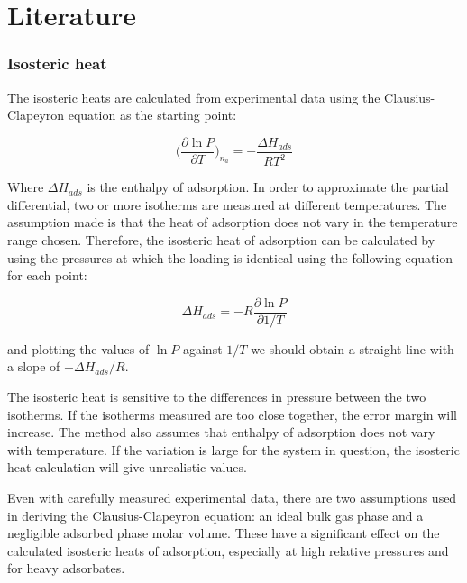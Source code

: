 
\section{Literature}


\subsubsection{Isosteric heat}

The isosteric heats are calculated from experimental data using the Clausius-Clapeyron
equation as the starting point:

\begin{equation}
    \Big( \frac{\partial \ln P}{\partial T} \Big)_{n_a} = -\frac{\Delta H_{ads}}{R T^2}
\end{equation}

Where \(\Delta H_{ads}\) is the enthalpy of adsorption. In order to approximate the
partial differential, two or more isotherms are measured at different temperatures. The
assumption made is that the heat of adsorption does not vary in the temperature range
chosen. Therefore, the isosteric heat of adsorption can be calculated by using the pressures
at which the loading is identical using the following equation for each point:

\begin{equation}
    \Delta H_{ads} = - R \frac{\partial \ln P}{\partial 1 / T}
\end{equation}

and plotting the values of \(\ln P\) against \(1 / T\) we should obtain a straight
line with a slope of \(- \Delta H_{ads} / R\).

The isosteric heat is sensitive to the differences in pressure between the two isotherms. If
the isotherms measured are too close together, the error margin will increase.
The method also assumes that enthalpy of adsorption does not vary with temperature. If the
variation is large for the system in question, the isosteric heat calculation will give
unrealistic values.

Even with carefully measured experimental data, there are two assumptions used in deriving
the Clausius-Clapeyron equation: an ideal bulk gas phase and a negligible adsorbed phase
molar volume. These have a significant effect on the calculated isosteric heats of adsorption,
especially at high relative pressures and for heavy adsorbates.
